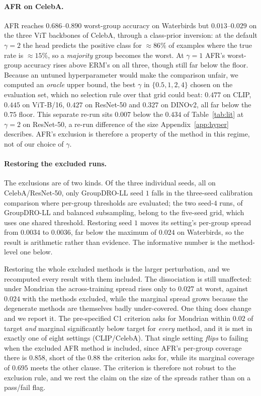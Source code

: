 \documentclass[pdflatex,sn-basic]{sn-jnl}%
\theoremstyle{thmstyleone}%
\begin{document}
\begin{appendices}
\paragraph{AFR on CelebA.} AFR reaches $0.686$--$0.890$ worst-group accuracy on Waterbirds but
$0.013$--$0.029$ on the three ViT backbones of CelebA, through a class-prior inversion: at the
default $\gamma=2$ the head predicts the positive class for $\approx\!86\%$ of examples where the
true rate is $\approx\!15\%$, so a \emph{majority} group becomes the worst. At $\gamma=1$ AFR's
worst-group accuracy rises above ERM's on all three, though still far below the floor. Because an
untuned hyperparameter would make the comparison unfair, we computed an \emph{oracle} upper bound,
the best $\gamma$ in $\{0.5,1,2,4\}$ chosen on the evaluation set, which no selection rule over that
grid could beat: $0.477$ on CLIP, $0.445$ on ViT-B/16, $0.427$ on ResNet-50 and $0.327$ on DINOv2,
all far below the $0.75$ floor. This separate re-run sits $0.007$ below the $0.434$ of
Table~\ref{tab:lit} at $\gamma=2$ on ResNet-50, a re-run difference of the size
Appendix~\ref{app:hyper} describes. AFR's exclusion is therefore a property of the method in this
regime, not of our choice of $\gamma$.

\paragraph{Restoring the excluded runs.} The exclusions are of two kinds. Of the three individual
seeds, all on CelebA/ResNet-50, only GroupDRO-LL seed $1$ falls in the three-seed calibration
comparison where per-group thresholds are evaluated; the two seed-$4$ runs, of GroupDRO-LL and
balanced subsampling, belong to the five-seed grid, which uses one shared threshold. Restoring seed
$1$ moves its setting's per-group spread from $0.0034$ to $0.0036$, far below the maximum of $0.024$
on Waterbirds, so the result is arithmetic rather than evidence. The informative number is the
method-level one below.

Restoring the whole excluded methods is the larger perturbation, and we recomputed every
result with them included. The dissociation is still unaffected: under Mondrian the
across-training spread rises only to $0.027$ at worst, against $0.024$ with the methods
excluded, while the marginal spread grows because the degenerate methods are themselves
badly under-covered. One thing does change and we report it. The pre-specified C1 criterion asks for Mondrian within
$0.02$ of target \emph{and} marginal significantly below target for \emph{every} method, and it is
met in exactly one of eight settings (CLIP/CelebA). That single setting \emph{flips} to failing
when the excluded AFR method is included, since AFR's per-group coverage there is $0.858$, short of the $0.88$ the criterion asks
for, while its marginal coverage of $0.695$ meets the other clause. The
criterion is therefore not robust to the exclusion rule, and we rest the claim on the size of the
spreads rather than on a pass/fail flag.


\end{appendices}
\end{document}
